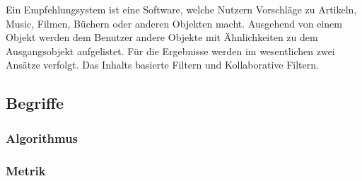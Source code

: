 Ein Empfehlungsystem ist eine Software, welche Nutzern Vorschläge zu Artikeln, Music, Filmen, Büchern oder anderen Objekten macht. \cite{Ricci2010} Ausgehend von einem Objekt werden dem Benutzer andere Objekte mit Ähnlichkeiten zu dem Ausgangsobjekt aufgelistet. Für die Ergebnisse werden im wesentlichen zwei Ansätze verfolgt. Das Inhalts basierte Filtern und Kollaborative Filtern.

\subsection{Begriffe}

\subsubsection{Algorithmus}
\subsubsection{Metrik}


 
	